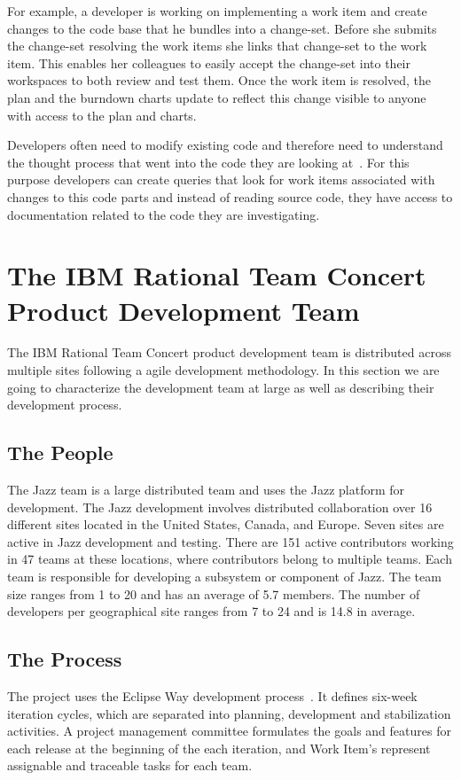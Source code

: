 For example, a developer is working on implementing a work item and create changes to the code base that he bundles into a change-set.
Before she submits the change-set resolving the work items she links that change-set to the work item.
This enables her colleagues to easily accept the change-set into their  workspaces to both review and test them.
Once the work item is resolved, the plan and the burndown charts update to reflect this change visible to anyone with access to the plan and charts.

Developers often need to modify existing code and therefore need to understand the thought process that went into the code they are looking at~\cite{}.
For this purpose developers can create queries that look for work items associated with changes to this code parts and instead of reading source code, they have access to documentation related to the code they are investigating.


\section{The IBM Rational Team Concert Product Development Team}
The IBM Rational Team Concert product development team is distributed across multiple sites following a agile development methodology.
In this section we are going to characterize the development team at large as well as describing their development process.

\subsection{The People}
The Jazz team is a large distributed team and uses the Jazz platform for development. 
The Jazz development involves distributed collaboration over 16 different sites located in the United States, Canada, and Europe. 
Seven sites are active in Jazz development and testing. 
There are 151 active contributors working in 47 teams at these locations, where contributors belong to multiple teams. 
Each team is responsible for developing a subsystem or component of Jazz.
The team size ranges from 1 to 20 and has an average of 5.7 members. 
The number of developers per geographical site ranges from 7 to 24 and is 14.8 in average.

\subsection{The Process}
The project uses the Eclipse Way development process~\cite{frost:ieeesoftware:2007}.
It defines six-week iteration cycles, which are separated into planning,
development and stabilization activities. A project management committee
formulates the goals and features for each release at the beginning of the each
iteration, and Work Item's represent assignable and traceable tasks for each
team.

